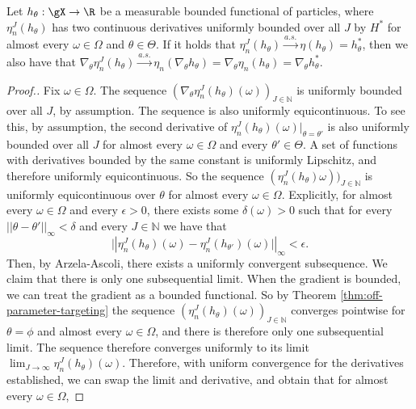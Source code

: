 \begin{thm}
\label{thm:consistent-derivatives}
    Let $h_\theta : \gX \to \R$ be a measurable bounded functional of particles, where $\eta_n^J(h_\theta)$ has two continuous derivatives uniformly bounded over all $J$ by $H^*$ for almost every $\omega\in\Omega$ and $\theta \in \Theta$. If it holds that $\eta_n^J(h_\theta) \stackrel{a.s.}{\to} \eta(h_\theta) = h^*_\theta$, then we also have that $\nabla_\theta \eta_n^J(h_\theta)  \stackrel{a.s.}{\to} \eta_n(\nabla_\theta h_\theta) = \nabla_\theta \eta_n(h_\theta) = \nabla_\theta h^*_\theta$. 
\end{thm}
\begin{proof}[Proof.]
    Fix $\omega \in \Omega$. The sequence $(\nabla_\theta \eta_n^J(h_\theta)(\omega))_{J \in \mathbb{N}}$ is uniformly bounded over all $J$, by assumption. The sequence is also uniformly equicontinuous. To see this, by assumption, the second derivative of $\eta_n^J(h_\theta)(\omega)|_{\theta=\theta'}$ is also uniformly bounded over all $J$ for almost every $\omega\in \Omega$ and every $\theta' \in \Theta$. A set of functions with derivatives bounded by the same constant is uniformly Lipschitz, and therefore uniformly equicontinuous. So the sequence $(\eta_n^J(h_\theta)\omega))_{J \in \mathbb{N}}$ is uniformly equicontinuous over $\theta$ for almost every $\omega \in \Omega$. 
    Explicitly, for almost every $\omega \in \Omega$ and every $\epsilon>0$, there exists some $\delta(\omega)>0$ such that for every $||\theta - \theta'||_{\infty}<\delta$ and every $J \in \mathbb{N}$ we have that
    \begin{equation}
    \big||\eta_n^J(h_\theta)(\omega)-\eta_n^J(h_{\theta'})(\omega)\big||_\infty < \epsilon.
    \end{equation}
    Then, by Arzela-Ascoli, there exists a uniformly convergent subsequence. We claim that there is only one subsequential limit. When the gradient is bounded, we can treat the gradient as a bounded functional. So by Theorem \ref{thm:off-parameter-targeting} the sequence $(\eta_n^J(h_\theta)(\omega))_{J \in \mathbb{N}}$ converges pointwise for $\theta=\phi$ and almost every $\omega \in \Omega$, and there is therefore only one subsequential limit. The sequence therefore converges uniformly to its limit $\lim_{J \to \infty} \eta_n^J(h_\theta)(\omega).$ Therefore, with uniform convergence for the derivatives established, we can swap the limit and derivative, and obtain that for almost every $\omega \in \Omega$, 

\end{proof}

